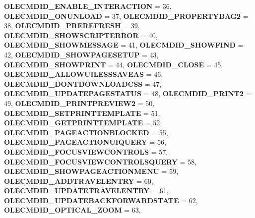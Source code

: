 \begin{DoxyCompactItemize}
{\bfseries O\+L\+E\+C\+M\+D\+I\+D\+\_\+\+E\+N\+A\+B\+L\+E\+\_\+\+I\+N\+T\+E\+R\+A\+C\+T\+I\+ON} = 36, 
\newline
{\bfseries O\+L\+E\+C\+M\+D\+I\+D\+\_\+\+O\+N\+U\+N\+L\+O\+AD} = 37, 
{\bfseries O\+L\+E\+C\+M\+D\+I\+D\+\_\+\+P\+R\+O\+P\+E\+R\+T\+Y\+B\+A\+G2} = 38, 
{\bfseries O\+L\+E\+C\+M\+D\+I\+D\+\_\+\+P\+R\+E\+R\+E\+F\+R\+E\+SH} = 39, 
{\bfseries O\+L\+E\+C\+M\+D\+I\+D\+\_\+\+S\+H\+O\+W\+S\+C\+R\+I\+P\+T\+E\+R\+R\+OR} = 40, 
\newline
{\bfseries O\+L\+E\+C\+M\+D\+I\+D\+\_\+\+S\+H\+O\+W\+M\+E\+S\+S\+A\+GE} = 41, 
{\bfseries O\+L\+E\+C\+M\+D\+I\+D\+\_\+\+S\+H\+O\+W\+F\+I\+ND} = 42, 
{\bfseries O\+L\+E\+C\+M\+D\+I\+D\+\_\+\+S\+H\+O\+W\+P\+A\+G\+E\+S\+E\+T\+UP} = 43, 
{\bfseries O\+L\+E\+C\+M\+D\+I\+D\+\_\+\+S\+H\+O\+W\+P\+R\+I\+NT} = 44, 
\newline
{\bfseries O\+L\+E\+C\+M\+D\+I\+D\+\_\+\+C\+L\+O\+SE} = 45, 
{\bfseries O\+L\+E\+C\+M\+D\+I\+D\+\_\+\+A\+L\+L\+O\+W\+U\+I\+L\+E\+S\+S\+S\+A\+V\+E\+AS} = 46, 
{\bfseries O\+L\+E\+C\+M\+D\+I\+D\+\_\+\+D\+O\+N\+T\+D\+O\+W\+N\+L\+O\+A\+D\+C\+SS} = 47, 
{\bfseries O\+L\+E\+C\+M\+D\+I\+D\+\_\+\+U\+P\+D\+A\+T\+E\+P\+A\+G\+E\+S\+T\+A\+T\+US} = 48, 
\newline
{\bfseries O\+L\+E\+C\+M\+D\+I\+D\+\_\+\+P\+R\+I\+N\+T2} = 49, 
{\bfseries O\+L\+E\+C\+M\+D\+I\+D\+\_\+\+P\+R\+I\+N\+T\+P\+R\+E\+V\+I\+E\+W2} = 50, 
{\bfseries O\+L\+E\+C\+M\+D\+I\+D\+\_\+\+S\+E\+T\+P\+R\+I\+N\+T\+T\+E\+M\+P\+L\+A\+TE} = 51, 
{\bfseries O\+L\+E\+C\+M\+D\+I\+D\+\_\+\+G\+E\+T\+P\+R\+I\+N\+T\+T\+E\+M\+P\+L\+A\+TE} = 52, 
\newline
{\bfseries O\+L\+E\+C\+M\+D\+I\+D\+\_\+\+P\+A\+G\+E\+A\+C\+T\+I\+O\+N\+B\+L\+O\+C\+K\+ED} = 55, 
{\bfseries O\+L\+E\+C\+M\+D\+I\+D\+\_\+\+P\+A\+G\+E\+A\+C\+T\+I\+O\+N\+U\+I\+Q\+U\+E\+RY} = 56, 
{\bfseries O\+L\+E\+C\+M\+D\+I\+D\+\_\+\+F\+O\+C\+U\+S\+V\+I\+E\+W\+C\+O\+N\+T\+R\+O\+LS} = 57, 
{\bfseries O\+L\+E\+C\+M\+D\+I\+D\+\_\+\+F\+O\+C\+U\+S\+V\+I\+E\+W\+C\+O\+N\+T\+R\+O\+L\+S\+Q\+U\+E\+RY} = 58, 
\newline
{\bfseries O\+L\+E\+C\+M\+D\+I\+D\+\_\+\+S\+H\+O\+W\+P\+A\+G\+E\+A\+C\+T\+I\+O\+N\+M\+E\+NU} = 59, 
{\bfseries O\+L\+E\+C\+M\+D\+I\+D\+\_\+\+A\+D\+D\+T\+R\+A\+V\+E\+L\+E\+N\+T\+RY} = 60, 
{\bfseries O\+L\+E\+C\+M\+D\+I\+D\+\_\+\+U\+P\+D\+A\+T\+E\+T\+R\+A\+V\+E\+L\+E\+N\+T\+RY} = 61, 
{\bfseries O\+L\+E\+C\+M\+D\+I\+D\+\_\+\+U\+P\+D\+A\+T\+E\+B\+A\+C\+K\+F\+O\+R\+W\+A\+R\+D\+S\+T\+A\+TE} = 62, 
\newline
{\bfseries O\+L\+E\+C\+M\+D\+I\+D\+\_\+\+O\+P\+T\+I\+C\+A\+L\+\_\+\+Z\+O\+OM} = 63, 

\end{DoxyCompactItemize}

